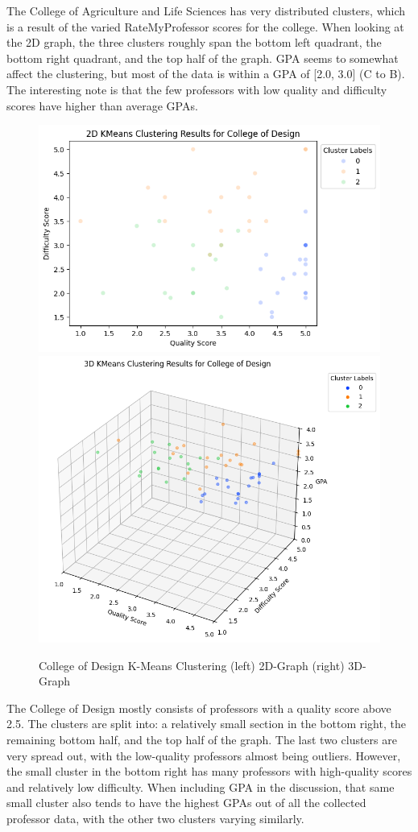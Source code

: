 \documentclass[sigconf,nonacm]{acmart}
\begin{document}
The College of Agriculture and Life Sciences has very distributed clusters, which is a result of the varied RateMyProfessor scores for the college. When looking at the 2D graph, the three clusters roughly span the bottom left quadrant, the bottom right quadrant, and the top half of the graph. GPA seems to somewhat affect the clustering, but most of the data is within a GPA of [2.0, 3.0] (C to B). The interesting note is that the few professors with low quality and difficulty scores have higher than average GPAs.

\begin{figure}[H]
    \centering
    \includegraphics[width=0.45\linewidth]{images/design-2d.png}
    \includegraphics[width=0.45\linewidth]{images/design-3d.png}
    \caption{College of Design K-Means Clustering (left) 2D-Graph (right) 3D-Graph}
    \label{fig:enter-label}
\end{figure}

The College of Design mostly consists of professors with a quality score above 2.5. The clusters are split into: a relatively small section in the bottom right, the remaining bottom half, and the top half of the graph. The last two clusters are very spread out, with the low-quality professors almost being outliers. However, the small cluster in the bottom right has many professors with high-quality scores and relatively low difficulty. When including GPA in the discussion, that same small cluster also tends to have the highest GPAs out of all the collected professor data, with the other two clusters varying similarly.
\end{document}
